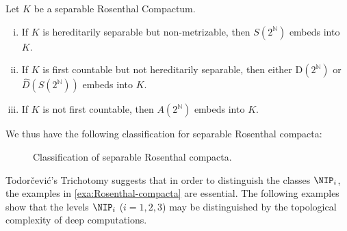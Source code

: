 \begin{theorem}\label{thm:Todorcevic-trichotomy}
    Let $K$ be a separable Rosenthal Compactum.
    \begin{enumerate}[(i)] 
        \item 
        If $K$ is hereditarily separable but non-metrizable, then $S(2^\mathbb{N})$ embeds into $K$.
        \item 
        If $K$ is first countable but not hereditarily separable, then either $\mathrm{D}(2^\mathbb{N})$ or $\hat{D}(S(2^\mathbb{N}))$ embeds into $K$.
        \item
         If $K$ is not first countable, then $A(2^\mathbb{N})$ embeds into $K$.
    \end{enumerate}
\end{theorem}

We thus have the following classification for separable Rosenthal compacta:

\begin{figure}[htbp]
    \centering
    
    \caption{Classification of separable Rosenthal compacta.}
    \label{fig:separable_compacta}
\end{figure}

Todorčević's Trichotomy suggests that in order to distinguish the classes $\NIP_i$, the examples in \ref{exa:Rosenthal-compacta} are essential.
The following examples show that the levels $\NIP_i$ ($i=1,2,3$) may be distinguished by the topological complexity of deep computations.

